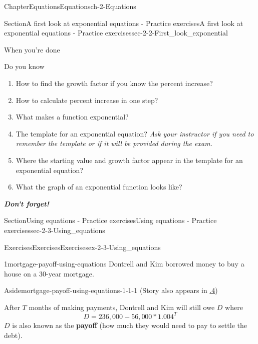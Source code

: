 \documentclass[twoside,11pt,]{book}
\newcommand{\xreffont}{\relax}
\newcommand{\alert}[1]{\textbf{\textit{#1}}}
\newcommand{\terminology}[1]{\textbf{#1}}
\numberwithin{equation}{section}
\begin{document}
\begin{chapterptx}{Chapter}{Equations}{}{Equations}{}{}{ch-2-Equations}
\begin{sectionptx}{Section}{A first look at exponential equations - Practice exercises}{}{A first look at exponential equations - Practice exercises}{}{}{sec-2-2-First_look_exponential}
\begin{conclusion}{When you're done \textellipsis{}}
%
\end{conclusion}%
\begin{conclusion}{Do you know \textellipsis{}}%
%
\begin{enumerate}[label={\Alph*.}]
\item{}How to find the growth factor if you know the percent increase?%
\item{}How to calculate percent increase in one step?%
\item{}What makes a function exponential?%
\item{}The template for an exponential equation? \emph{Ask your instructor if you need to remember the template or if it will be provided during the exam.}%
\item{}Where the starting value and growth factor appear in the template for an exponential equation?%
\item{}What the graph of an exponential function looks like?%
\end{enumerate}
%
\par
\alert{Don't forget!}%
\end{conclusion}%
\end{sectionptx}
%
%
\typeout{************************************************}
\typeout{************************************************}
%
\begin{sectionptx}{Section}{Using equations - Practice exercises}{}{Using equations - Practice exercises}{}{}{sec-2-3-Using_equations}
%
%
\typeout{************************************************}
\typeout{************************************************}
%
\begin{exercises-subsection-numberless}{Exercises}{Exercises}{}{Exercises}{}{}{ex-2-3-Using_equations}
\begin{divisionexercise}{1}{}{}{mortgage-payoff-using-equations}%
Dontrell and Kim borrowed money to buy a house on a 30-year mortgage. \begin{aside}{Aside}{}{mortgage-payoff-using-equations-1-1-1}%
(Story also appears in \hyperlink{mortgage-payoff-solving-exponential}{{\xreffont 3.4.4}})%
\end{aside}
 After \(T\) months of making payments, Dontrell and Kim will still owe \textdollar{}\(D\) where%
\begin{equation*}
D=236{,}000-56{,}000 \ast 1.004^T
\end{equation*}
\(D\) is also known as the \terminology{payoff} (how much they would need to pay to settle the debt).%

\end{divisionexercise}
\end{exercises-subsection-numberless}
\end{sectionptx}
\end{chapterptx}
\end{document}
